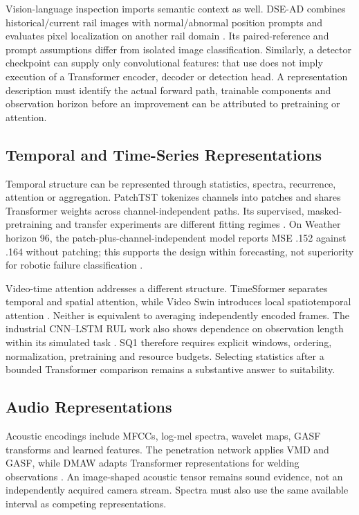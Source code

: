 Vision-language inspection imports semantic context as well. DSE-AD combines historical/current rail images with normal/abnormal position prompts and evaluates pixel localization on another rail domain \citep{P031}. Its paired-reference and prompt assumptions differ from isolated image classification. Similarly, a detector checkpoint can supply only convolutional features: that use does not imply execution of a Transformer encoder, decoder or detection head. A representation description must identify the actual forward path, trainable components and observation horizon before an improvement can be attributed to pretraining or attention.

\subsection{Temporal and Time-Series Representations}
Temporal structure can be represented through statistics, spectra, recurrence, attention or aggregation. PatchTST tokenizes channels into patches and shares Transformer weights across channel-independent paths. Its supervised, masked-pretraining and transfer experiments are different fitting regimes \citep[PDF pp.~3--8]{Nie2023PatchTST}. On Weather horizon 96, the patch-plus-channel-independent model reports MSE .152 against .164 without patching; this supports the design within forecasting, not superiority for robotic failure classification \citep[PDF p.~9, Table~7]{Nie2023PatchTST}.

Video-time attention addresses a different structure. TimeSformer separates temporal and spatial attention, while Video Swin introduces local spatiotemporal attention \citep{P034,P013}. Neither is equivalent to averaging independently encoded frames. The industrial CNN--LSTM RUL work also shows dependence on observation length within its simulated task \citep{AlDulaimi2019A}. SQ1 therefore requires explicit windows, ordering, normalization, pretraining and resource budgets. Selecting statistics after a bounded Transformer comparison remains a substantive answer to suitability.

\subsection{Audio Representations}
Acoustic encodings include MFCCs, log-mel spectra, wavelet maps, GASF transforms and learned features. The penetration network applies VMD and GASF, while DMAW adapts Transformer representations for welding observations \citep{Hua2026Weld,P003}. An image-shaped acoustic tensor remains sound evidence, not an independently acquired camera stream. Spectra must also use the same available interval as competing representations.

